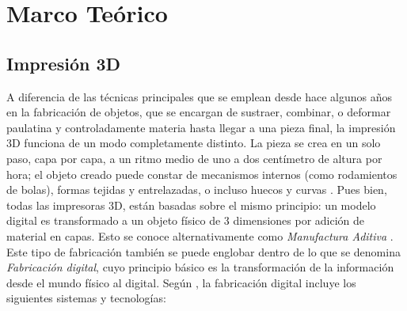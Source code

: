 

\chapter{Marco Te\'orico}
\label{cap:preliminares}

\section{Impresión 3D}

 A diferencia de las técnicas principales que se emplean desde hace algunos años en la fabricación de objetos, que se encargan de sustraer, combinar, o deformar paulatina y controladamente materia hasta llegar a una pieza final, la impresión 3D funciona de un modo completamente distinto. La pieza se crea en un solo paso, capa por capa, a un ritmo medio de uno a dos centímetro de altura por hora; el objeto creado puede constar de mecanismos internos (como rodamientos de bolas), formas tejidas y entrelazadas, o incluso huecos y curvas \citep{Berchon2014}. Pues bien, todas las impresoras 3D, están basadas sobre el mismo principio: un modelo digital es transformado a un objeto físico de 3 dimensiones por adición de material en capas. Esto se conoce alternativamente como \textit{Manufactura Aditiva} \citep{tresdhub2018}. Este tipo de fabricación también se puede englobar dentro de lo que se denomina \textit{Fabricación digital}, cuyo principio básico es la transformación de la información  desde el mundo físico al digital. Según \citep{jorquera2016}, la fabricación digital incluye los siguientes sistemas y tecnologías:\\
 
